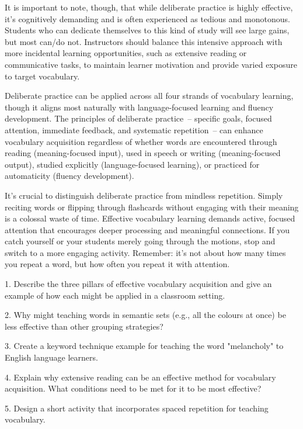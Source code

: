 It is important to note, though, that while deliberate practice is highly effective, it's cognitively demanding and is often experienced as tedious and monotonous. Students who can dedicate themselves to this kind of study will see large gains, but most can/do not. Instructors should balance this intensive approach with more incidental learning opportunities, such as extensive reading or communicative tasks, to maintain learner motivation and provide varied exposure to target vocabulary.

Deliberate practice can be applied across all four strands of vocabulary learning, though it aligns most naturally with language-focused learning and fluency development. The principles of deliberate practice~-- specific goals, focused attention, immediate feedback, and systematic repetition~-- can enhance vocabulary acquisition regardless of whether words are encountered through reading (meaning-focused input), used in speech or writing (meaning-focused output), studied explicitly (language-focused learning), or practiced for automaticity (fluency development).

\begin{tcolorbox}[title=Warning: Mindless Repetition, colback=white, colframe=red!75!black, fonttitle=\bfseries]
It's crucial to distinguish deliberate practice from mindless repetition. Simply reciting words or flipping through flashcards without engaging with their meaning is a colossal waste of time. Effective vocabulary learning demands active, focused attention that encourages deeper processing and meaningful connections. If you catch yourself or your students merely going through the motions, stop and switch to a more engaging activity. Remember: it's not about how many times you repeat a word, but how often you repeat it with attention.
\end{tcolorbox}

\begin{tcolorbox}[title=Exercise: Teaching and Learning Vocabulary, colback=white, colframe=orange!75!black, fonttitle=\bfseries]
1. Describe the three pillars of effective vocabulary acquisition and give an example of how each might be applied in a classroom setting.

2. Why might teaching words in semantic sets (e.g., all the colours at once) be less effective than other grouping strategies?

3. Create a keyword technique example for teaching the word "melancholy" to English language learners.

4. Explain why extensive reading can be an effective method for vocabulary acquisition. What conditions need to be met for it to be most effective?

5. Design a short activity that incorporates spaced repetition for teaching vocabulary.
\end{tcolorbox}

